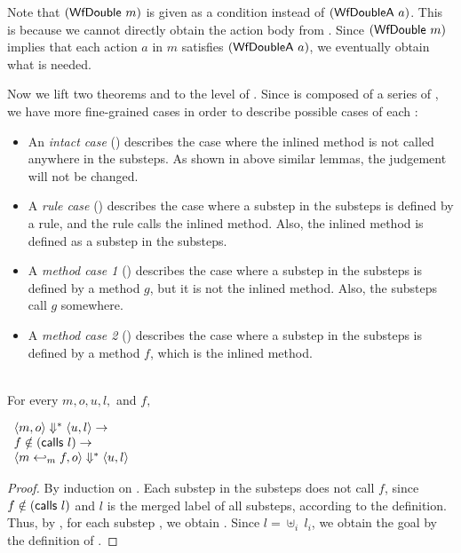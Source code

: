 Note that $(\textsf{WfDouble}\ m)$ is given as a condition instead of
$(\textsf{WfDoubleA}\ a)$. This is because we cannot directly obtain the
action body from \Substep{}. Since $(\textsf{WfDouble}\ m)$ implies that each
action $a$ in $m$ satisfies $(\textsf{WfDoubleA}\ a)$, we eventually obtain
what is needed.

Now we lift two theorems  and
 to the level of \Substeps{}. Since
\Substeps{} is composed of a series of \Substep{}, we have more
fine-grained cases in order to describe possible cases of each
\Substep{}:
\begin{itemize}
\item An \emph{intact case} () describes
  the case where the inlined method is not called anywhere in the
  substeps. As shown in above similar lemmas, the judgement will not
  be changed.
\item A \emph{rule case} () describes the
  case where a substep in the substeps is defined by a rule, and the
  rule calls the inlined method. Also, the inlined method is defined
  as a substep in the substeps.
\item A \emph{method case 1} () describes
  the case where a substep in the substeps is defined by a method $g$,
  but it is not the inlined method. Also, the substeps call $g$
  somewhere.
\item A \emph{method case 2} () describes
  the case where a substep in the substeps is defined by a method $f$,
  which is the inlined method.
\end{itemize}

\begin{lemma}
  \label{lem-inlinedmm-intact}
  \mbox{}\\
  For every $m, o, u, l,$ and $f,$
  \begin{center}
    \begin{math}
      \begin{array}{l}
        \langle m, o \rangle \Downarrow^{\ast} \langle u, l \rangle \to \\
        f \notin (\textsf{calls}\ l) \to \\
        \langle m \hookleftarrow_{m}{} f, o \rangle \Downarrow^{\ast} \langle u, l \rangle
      \end{array}
    \end{math}
  \end{center}
\end{lemma}
\begin{proof}
  By induction on \Substeps{}. Each substep in the substeps does not
  call $f$, since $f \notin (\textsf{calls}\ l)$ and $l$ is the merged label
  of all substeps, according to the definition. Thus, by
  , for each substep
  , we obtain
  . Since $l = \uplus_i\ l_i$,
  we obtain the goal by the definition of \Substeps{}.
\end{proof}

